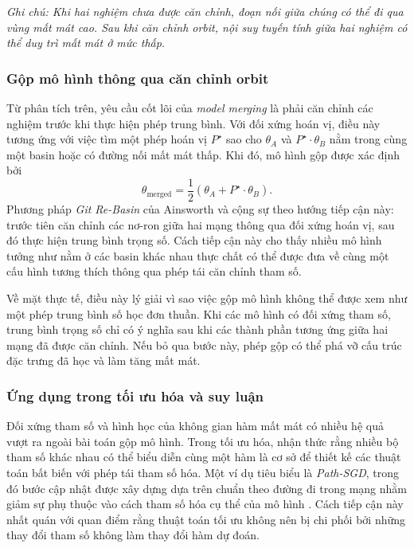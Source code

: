 \vspace{-2.0em}
\noindent\textit{Ghi chú: Khi hai nghiệm chưa được căn chỉnh, đoạn nối giữa chúng có thể đi qua vùng mất mát cao. Sau khi căn chỉnh orbit, nội suy tuyến tính giữa hai nghiệm có thể duy trì mất mát ở mức thấp.}

\subsubsection{Gộp mô hình thông qua căn chỉnh orbit}

Từ phân tích trên, yêu cầu cốt lõi của \textit{model merging} là phải căn chỉnh các nghiệm trước khi thực hiện phép trung bình. Với đối xứng hoán vị, điều này tương ứng với việc tìm một phép hoán vị $P^\star$ sao cho $\theta_A$ và $P^\star \cdot \theta_B$ nằm trong cùng một basin hoặc có đường nối mất mát thấp. Khi đó, mô hình gộp được xác định bởi
\begin{equation}
    \theta_{\mathrm{merged}}
    =
    \frac{1}{2}
    \left(
        \theta_A + P^\star \cdot \theta_B
    \right).
    \label{eq:aligned-model-merging}
\end{equation}
Phương pháp \textit{Git Re-Basin} của Ainsworth và cộng sự \cite{ainsworth2023git} theo hướng tiếp cận này: trước tiên căn chỉnh các nơ-ron giữa hai mạng thông qua đối xứng hoán vị, sau đó thực hiện trung bình trọng số. Cách tiếp cận này cho thấy nhiều mô hình tưởng như nằm ở các basin khác nhau thực chất có thể được đưa về cùng một cấu hình tương thích thông qua phép tái căn chỉnh tham số.

Về mặt thực tế, điều này lý giải vì sao việc gộp mô hình không thể được xem như một phép trung bình số học đơn thuần. Khi các mô hình có đối xứng tham số, trung bình trọng số chỉ có ý nghĩa sau khi các thành phần tương ứng giữa hai mạng đã được căn chỉnh. Nếu bỏ qua bước này, phép gộp có thể phá vỡ cấu trúc đặc trưng đã học và làm tăng mất mát.

\subsubsection{Ứng dụng trong tối ưu hóa và suy luận}

Đối xứng tham số và hình học của không gian hàm mất mát có nhiều hệ quả vượt ra ngoài bài toán gộp mô hình. Trong tối ưu hóa, nhận thức rằng nhiều bộ tham số khác nhau có thể biểu diễn cùng một hàm là cơ sở để thiết kế các thuật toán bất biến với phép tái tham số hóa. Một ví dụ tiêu biểu là \textit{Path-SGD}, trong đó bước cập nhật được xây dựng dựa trên chuẩn theo đường đi trong mạng nhằm giảm sự phụ thuộc vào cách tham số hóa cụ thể của mô hình \cite{neyshabur2015path}. Cách tiếp cận này nhất quán với quan điểm rằng thuật toán tối ưu không nên bị chi phối bởi những thay đổi tham số không làm thay đổi hàm dự đoán.

